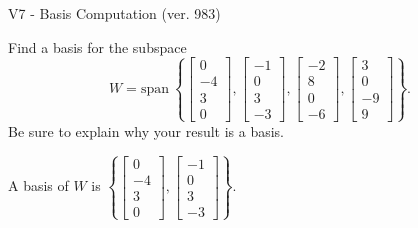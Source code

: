 \begin{exercise}
  \begin{exerciseTitle}V7 - Basis Computation (ver. 983)\end{exerciseTitle}
  \begin{exerciseStatement}
    Find a basis for the subspace 
\[W=\mathrm{span}\ \left\{\left[\begin{array}{r}
0 \\
-4 \\
3 \\
0
\end{array}\right] , \left[\begin{array}{r}
-1 \\
0 \\
3 \\
-3
\end{array}\right] , \left[\begin{array}{r}
-2 \\
8 \\
0 \\
-6
\end{array}\right] , \left[\begin{array}{r}
3 \\
0 \\
-9 \\
9
\end{array}\right]\right\}.\]
 Be sure to explain why your result is a basis.


  \end{exerciseStatement}
  \begin{exerciseAnswer}
   A basis of \(W\) is  \(\left\{\left[\begin{array}{r}
0 \\
-4 \\
3 \\
0
\end{array}\right] , \left[\begin{array}{r}
-1 \\
0 \\
3 \\
-3
\end{array}\right]\right\}\).
  


  \end{exerciseAnswer}
\end{exercise}